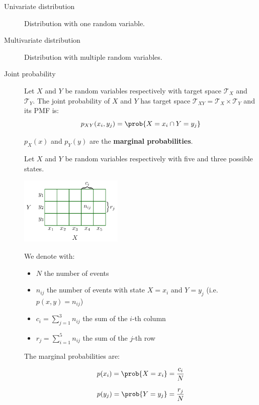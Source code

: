 \begin{description}
    \item[Univariate distribution] 
        Distribution with one random variable.
    
    \item[Multivariate distribution] 
        Distribution with multiple random variables.
    
    \item[Joint probability] 
        Let $X$ and $Y$ be random variables respectively with target space $\mathcal{T}_X$ and $\mathcal{T}_Y$.
        The joint probability of $X$ and $Y$ has target space $\mathcal{T}_{XY} = \mathcal{T}_X \times \mathcal{T}_Y$
        and its PMF is:
        \[ p_{XY}(x_i, y_j) = \prob{X = x_i \cap Y = y_j} \]

        $p_X(x)$ and $p_Y(y)$ are the \textbf{marginal probabilities}. 

        \begin{example}
            Let $X$ and $Y$ be random variables respectively with five and three possible states.
            \begin{center}
                \includegraphics[width=0.4\textwidth]{img/_joint_probability_example.pdf}
            \end{center}
            We denote with:
            \begin{itemize}
                \item $N$ the number of events
                \item $n_{ij}$ the number of events with state $X=x_i$ and $Y=y_j$ (i.e. $p(x, y) = n_{ij}$)
                \item $c_i = \sum_{j=1}^{3} n_{ij}$ the sum of the $i$-th column
                \item $r_j = \sum_{i=1}^{5} n_{ij}$ the sum of the $j$-th row
            \end{itemize}

            The marginal probabilities are:\\
            \begin{minipage}{.48\linewidth}
                \centering
                \[ p(x_i) = \prob{X = x_i} = \frac{c_i}{N} \]
            \end{minipage}
            \begin{minipage}{.48\linewidth}
                \centering
                \[ p(y_j) = \prob{Y = y_j} = \frac{r_j}{N} \]
            \end{minipage}


\end{example}
\end{description}

